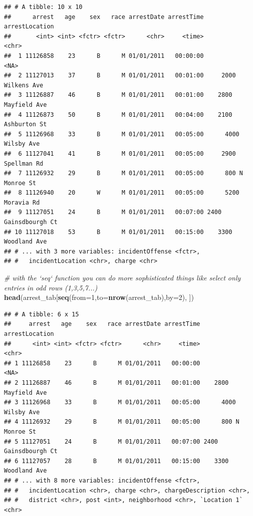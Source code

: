 \documentclass[]{article}
\newenvironment{Shaded}{\begin{snugshade}}{\end{snugshade}}
\newcommand{\KeywordTok}[1]{\textcolor[rgb]{0.13,0.29,0.53}{\textbf{{#1}}}}
\newcommand{\DataTypeTok}[1]{\textcolor[rgb]{0.13,0.29,0.53}{{#1}}}
\newcommand{\DecValTok}[1]{\textcolor[rgb]{0.00,0.00,0.81}{{#1}}}
\newcommand{\CommentTok}[1]{\textcolor[rgb]{0.56,0.35,0.01}{\textit{{#1}}}}
\newcommand{\NormalTok}[1]{{#1}}
\theoremstyle{definition}
\theoremstyle{definition}
\theoremstyle{remark}
\begin{document}
\begin{verbatim}
## # A tibble: 10 x 10
##      arrest   age    sex   race arrestDate arrestTime       arrestLocation
##       <int> <int> <fctr> <fctr>      <chr>     <time>                <chr>
##  1 11126858    23      B      M 01/01/2011   00:00:00                 <NA>
##  2 11127013    37      B      M 01/01/2011   00:01:00     2000 Wilkens Ave
##  3 11126887    46      B      M 01/01/2011   00:01:00    2800 Mayfield Ave
##  4 11126873    50      B      M 01/01/2011   00:04:00    2100 Ashburton St
##  5 11126968    33      B      M 01/01/2011   00:05:00      4000 Wilsby Ave
##  6 11127041    41      B      M 01/01/2011   00:05:00     2900 Spellman Rd
##  7 11126932    29      B      M 01/01/2011   00:05:00      800 N Monroe St
##  8 11126940    20      W      M 01/01/2011   00:05:00      5200 Moravia Rd
##  9 11127051    24      B      M 01/01/2011   00:07:00 2400 Gainsdbourgh Ct
## 10 11127018    53      B      M 01/01/2011   00:15:00    3300 Woodland Ave
## # ... with 3 more variables: incidentOffense <fctr>,
## #   incidentLocation <chr>, charge <chr>
\end{verbatim}

\begin{Shaded}
\begin{Highlighting}[]
\CommentTok{# with the `seq` function you can do more sophisticated things like select only entries in odd rows (1,3,5,7...)}
\KeywordTok{head}\NormalTok{(arrest_tab[}\KeywordTok{seq}\NormalTok{(}\DataTypeTok{from=}\DecValTok{1}\NormalTok{,}\DataTypeTok{to=}\KeywordTok{nrow}\NormalTok{(arrest_tab),}\DataTypeTok{by=}\DecValTok{2}\NormalTok{), ])}
\end{Highlighting}
\end{Shaded}

\begin{verbatim}
## # A tibble: 6 x 15
##     arrest   age    sex   race arrestDate arrestTime       arrestLocation
##      <int> <int> <fctr> <fctr>      <chr>     <time>                <chr>
## 1 11126858    23      B      M 01/01/2011   00:00:00                 <NA>
## 2 11126887    46      B      M 01/01/2011   00:01:00    2800 Mayfield Ave
## 3 11126968    33      B      M 01/01/2011   00:05:00      4000 Wilsby Ave
## 4 11126932    29      B      M 01/01/2011   00:05:00      800 N Monroe St
## 5 11127051    24      B      M 01/01/2011   00:07:00 2400 Gainsdbourgh Ct
## 6 11127057    28      B      M 01/01/2011   00:15:00    3300 Woodland Ave
## # ... with 8 more variables: incidentOffense <fctr>,
## #   incidentLocation <chr>, charge <chr>, chargeDescription <chr>,
## #   district <chr>, post <int>, neighborhood <chr>, `Location 1` <chr>
\end{verbatim}
\end{document}
